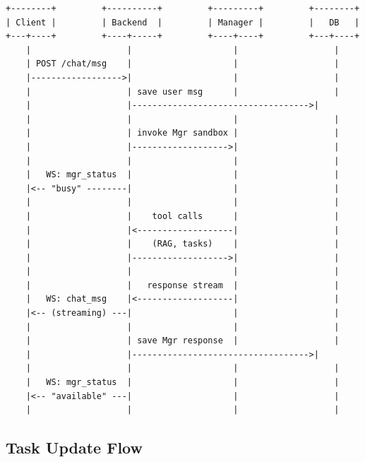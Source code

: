 \documentclass[11pt,a4paper]{article}
\begin{document}
\begin{verbatim}
+--------+         +----------+         +---------+         +--------+
| Client |         | Backend  |         | Manager |         |   DB   |
+---+----+         +----+-----+         +----+----+         +---+----+
    |                   |                    |                   |
    | POST /chat/msg    |                    |                   |
    |------------------>|                    |                   |
    |                   | save user msg      |                   |
    |                   |----------------------------------->|
    |                   |                    |                   |
    |                   | invoke Mgr sandbox |                   |
    |                   |------------------->|                   |
    |                   |                    |                   |
    |   WS: mgr_status  |                    |                   |
    |<-- "busy" --------|                    |                   |
    |                   |                    |                   |
    |                   |    tool calls      |                   |
    |                   |<-------------------|                   |
    |                   |    (RAG, tasks)    |                   |
    |                   |------------------->|                   |
    |                   |                    |                   |
    |                   |   response stream  |                   |
    |   WS: chat_msg    |<-------------------|                   |
    |<-- (streaming) ---|                    |                   |
    |                   |                    |                   |
    |                   | save Mgr response  |                   |
    |                   |----------------------------------->|
    |                   |                    |                   |
    |   WS: mgr_status  |                    |                   |
    |<-- "available" ---|                    |                   |
    |                   |                    |                   |
\end{verbatim}

\subsection{Task Update Flow}
\end{document}

